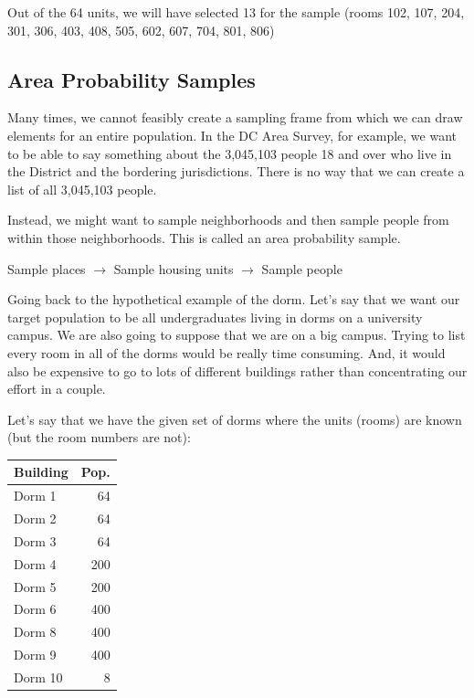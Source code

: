 \documentclass[11pt]{lecturenotes}
\begin{document}
\normalsize

Out of the 64 units, we will have selected 13 for the sample (rooms 102, 107, 204, 301, 306, 403, 408, 505, 602, 607, 704, 801, 806)





\subsection[20]{Area Probability Samples}
Many times, we cannot feasibly create a sampling frame from which we can draw elements for an entire population. In the DC Area Survey, for example, we want to be able to say something about the 3,045,103 people 18 and over who live in the District and the bordering jurisdictions. There is no way that we can create a list of all 3,045,103 people. 

Instead, we might want to sample neighborhoods and then sample people from within those neighborhoods. This is called an area probability sample.

\slide
{\centering 
Sample places $\longrightarrow$ Sample housing units $\longrightarrow$ Sample people

}

Going back to the hypothetical example of the dorm. Let's say that we want our target population to be all undergraduates living in dorms on a university campus. We are also going to suppose that we are on a big campus. Trying to list every room in all of the dorms would be really time consuming. And, it would also be expensive to go to lots of different buildings rather than concentrating our effort in a couple. 

Let's say that we have the given set of dorms where the units (rooms) are known (but the room numbers are not): 

\slide
\begin{tabular}{lr}
\textbf{Building} & \textbf{Pop.} \\ \toprule
Dorm 1 & 64 \\
Dorm 2 & 64 \\
Dorm 3 & 64 \\
Dorm 4 & 200 \\
Dorm 5 & 200 \\
Dorm 6 & 400 \\
Dorm 8 & 400 \\
Dorm 9 & 400 \\
Dorm 10 & 8 \\ \bottomrule
\end{tabular}
\end{document}
